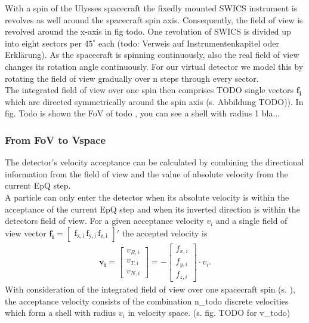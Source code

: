 With a spin of the Ulysses spacecraft the fixedly mounted SWICS instrument is revolves as well around the spacecraft spin axis. Consequently, the field of view is revolved around the x-axis in fig todo. One revolution of SWICS is divided up into eight sectors per $45^\circ$ each (todo: Verweis auf Instrumentenkapitel oder Erklärung). As the spacecraft is spinning continuously, also the real field of view changes its rotation angle continuously.
For our virtual detector we model this by rotating the field of view gradually over n steps through every sector.\\
The integrated field of view over one spin then comprises TODO single vectors $\mathrm{\mathbf{f_i}}$ which are directed symmetrically around the spin axis (s. Abbildung TODO)). In fig. Todo is shown the FoV of todo , you can see a shell with radius 1 bla...
\subsubsection{From FoV to Vspace}
The detector's velocity acceptance can be calculated by combining the directional information from the field of view and the value of absolute velocity from the current EpQ step. 
\\
A particle can only enter the detector when its absolute velocity is within the acceptance of the current EpQ step and when its inverted direction is within the detectors field of view. For a given acceptance velocity $v_i$ and a single field of view vector $\mathrm{\mathbf{f_i} = \begin{bmatrix}f_{x,i}\,f_{y,i}\,f_{z,i}\end{bmatrix}}'$ the accepted velocity is
\begin{align}
\mathbf{v_i} = \begin{bmatrix}v_{R,i}\\v_{T,i}\\v_{N,i}\end{bmatrix} = - \begin{bmatrix}f_{x,i}\\f_{y,i}\\f_{z,i}\end{bmatrix} \cdot v_i.
\label{eq:fov}
\end{align}
With consideration of the integrated field of view over one spacecraft spin (s. ), the acceptance velocity consists of the combination n\_todo discrete velocities which form a shell with radius $v_i$ in velocity space. (s. fig. TODO for v\_todo)




